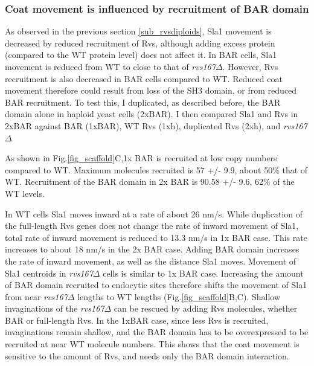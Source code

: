 	\subsubsection{Coat movement is influenced by recruitment of BAR domain }
As observed in the previous section \ref{sub_rvsdiploids}, Sla1 movement is decreased by reduced recruitment of Rvs, although adding excess protein (compared to the WT protein level) does not affect it. In BAR cells, Sla1 movement is reduced from WT to close to that of \textit{rvs167$\Delta$}. However, Rvs recruitment is also decreased in BAR cells compared to WT. Reduced coat movement therefore could result from loss of the SH3 domain, or from reduced BAR recruitment. To test this, I duplicated, as described before, the BAR domain alone in haploid yeast cells (2xBAR). I then compared Sla1 and Rvs in 2xBAR against BAR (1xBAR), WT Rvs (1xh), duplicated Rvs (2xh), and \textit{rvs167$\Delta$}

	\vspace{5mm}
 As shown in Fig.\ref{fig_scaffold}C,1x BAR is recruited at low copy numbers compared to WT. Maximum molecules recruited is 57 +/- 9.9, about 50\% that of WT. Recruitment of the BAR domain in 2x BAR is 90.58 +/- 9.6, 62\% of the WT levels. 
 
	\vspace{5mm}
In WT cells Sla1 moves inward at a rate of about 26 nm/s. While duplication of the full-length Rvs genes does not change the rate of inward movement of Sla1, total rate of inward movement is reduced to 13.3 nm/s in 1x BAR case. This rate increases to about 18 nm/s in the 2x BAR case. Adding BAR domain increases the rate of inward movement, as well as the distance Sla1 moves. Movement of Sla1 centroids in \textit{rvs167$\Delta$} cells is similar to 1x BAR case. Increasing the amount of BAR domain recruited to endocytic sites therefore shifts the movement of Sla1 from near \textit{rvs167$\Delta$} lengths to WT lengths (Fig.\ref{fig_scaffold}B,C).
	\vspace{5mm}
Shallow invaginations of the \textit{rvs167$\Delta$} can be rescued by adding Rvs molecules, whether BAR or full-length Rvs. In the 1xBAR case, since less Rvs is recruited, invaginations remain shallow, and the BAR domain has to be overexpressed to be recruited at near WT molecule numbers.
This shows that the coat movement is sensitive to the amount of Rvs, and needs only the BAR domain interaction.



